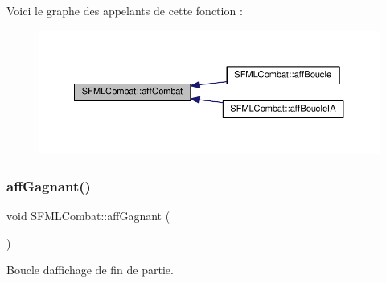 Voici le graphe des appelants de cette fonction \+:\nopagebreak
\begin{figure}[H]
\begin{center}
\leavevmode
\includegraphics[width=350pt]{class_s_f_m_l_combat_a4b2bed6ea12c96a58e55d968b1652597_icgraph}
\end{center}
\end{figure}
\mbox{\label{class_s_f_m_l_combat_ace8cd35d8b2bbc86478a7a28bf0996b4}} 
\subsubsection{\texorpdfstring{aff\+Gagnant()}{affGagnant()}}
{\footnotesize\ttfamily void S\+F\+M\+L\+Combat\+::aff\+Gagnant (\begin{DoxyParamCaption}{ }\end{DoxyParamCaption})\hspace{0.3cm}{\ttfamily [private]}}



Boucle d\textquotesingle{}affichage de fin de partie. 

